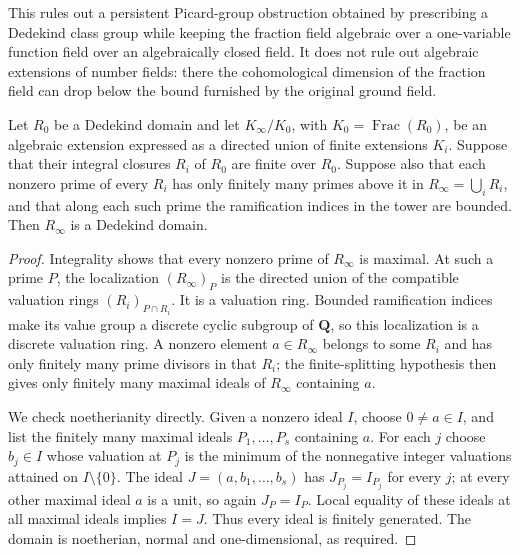 This rules out a persistent Picard-group obstruction obtained by
prescribing a Dedekind class group while keeping the fraction field
algebraic over a one-variable function field over an algebraically
closed field.  It does not rule out algebraic extensions of number
fields: there the cohomological dimension of the fraction field can
drop below the bound furnished by the original ground field.

\begin{lemma}
\label{C:A2-tower-Dedekind}
Let $R_0$ be a Dedekind domain and let $K_\infty/K_0$, with
$K_0=\operatorname{Frac}(R_0)$, be an algebraic extension expressed as
a directed union of finite extensions $K_i$.  Suppose that their
integral closures $R_i$ of $R_0$ are finite over $R_0$.  Suppose also
that each nonzero prime of every $R_i$ has only finitely many primes
above it in $R_\infty=\bigcup_iR_i$, and that along each such prime
the ramification indices in the tower are bounded.  Then
$R_\infty$ is a Dedekind domain.
\end{lemma}

\begin{proof}
Integrality shows that every nonzero prime of $R_\infty$ is maximal.
At such a prime $P$, the localization $(R_\infty)_P$ is the directed
union of the compatible valuation rings $(R_i)_{P\cap R_i}$.  It is
a valuation ring.  Bounded ramification indices make its value group
a discrete cyclic subgroup of $\mathbf Q$, so this localization is
a discrete valuation ring.  A nonzero element $a\in R_\infty$
belongs to some $R_i$ and has only finitely many prime divisors in
that $R_i$; the finite-splitting hypothesis then gives only finitely
many maximal ideals of $R_\infty$ containing $a$.

We check noetherianity directly.  Given a nonzero ideal $I$, choose
$0\ne a\in I$, and list the finitely many maximal ideals
$P_1,\dots,P_s$ containing $a$.  For each $j$ choose $b_j\in I$
whose valuation at $P_j$ is the minimum of the nonnegative integer
valuations attained on $I\setminus\{0\}$.  The ideal
$J=(a,b_1,\dots,b_s)$ has $J_{P_j}=I_{P_j}$ for every $j$; at every
other maximal ideal $a$ is a unit, so again $J_P=I_P$.  Local equality
of these ideals at all maximal ideals implies $I=J$.  Thus every
ideal is finitely generated.  The domain is noetherian, normal and
one-dimensional, as required.
\end{proof}
